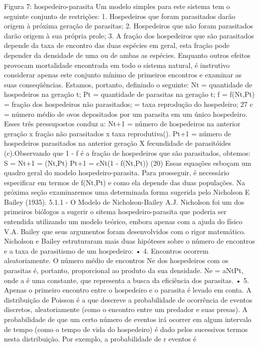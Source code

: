 {{{{{{Figura 7: hospedeiro-parasita 
Um modelo simples para este sistema tem o seguinte conjunto de restrições: 
1. Hospedeiros que foram parasitados darão origem à próxima geração de parasitas; 
2. Hospedeiros que não foram parasitados darão origem à sua própria prole; 
3. A fração dos hospedeiros que são parasitados depende da taxa de encontro das duas espécies em geral, esta fração pode depender da densidade de uma ou de ambas as espécies. 
Enquanto outros efeitos provocam mortalidade encontrada em todo o sistema natural, é instrutivo considerar apenas este conjunto mínimo de primeiros encontros e examinar as suas conseqüências. Estamos, portanto, definindo o seguinte: 
Nt = quantidade de hospedeiros na geração t; 
Pt = quantidade de parasitas na geração t; 
f = f(Nt,Pt) = fração dos hospedeiros não parasitados; 
\lambda = taxa reprodução do hospedeiro; 
27 
c = número médio de ovos depositados por um parasita em um único hospedeiro. Esses três pressupostos conduz a: Nt+1 = número de hospedeiros na anterior geração x fração não parasitados x taxa reprodutiva(\lambda). Pt+1 = número de hospedeiros parasitados na anterior geração X fecundidade de parasitóides (c).Observando que 1 - f é a fração de hospedeiros que são parasitados, obtemos: 
S = 
{ Nt+1 = \lambdaNtf(Nt,Pt) 
Pt+1 = cNt(1 - f(Nt,Pt)) (20) Essas equações esboçam um quadro geral do modelo hospedeiro-parasita. Para prosseguir, é necessário especificar em termos de f(Nt,Pt) e como ela depende das duas populações. Na próxima seção examinaremos uma determinada forma sugerida pelo Nicholson E Bailey (1935). 
5.1.1 - O Modelo de Nicholson-Bailey 
A.J. Nicholson foi um dos primeiros biólogos a sugerir o sitema hospedeiro-parasita que poderia ser entendida utilizando um modelo teórico, embora apenas com a ajuda do físico V.A. Bailey que seus argumentos foram desenvolvidos com o rigor matemático. 
Nicholson e Bailey estruturaram mais duas hipóteses sobre o número de encontros e a taxa de parasitismo de um hospedeiro: 
• 4. Encontros ocorrem aleatoriamente. O número médio de encontros Ne dos hospedeiros com os parasitas é, portanto, proporcional ao produto da sua densidade. 
Ne = aNtPt, 
onde a é uma constante, que representa a busca da eficiência dos parasitas. 
• 5. Apenas o primeiro encontro entre o hospedeiro e o parasita é levado em conta. 
A distribuição de Poisson é a que descreve a probabilidade de ocorrência de eventos discretos, aleatoriamente (como o encontro entre um predador e suas presas). A probabilidade de que um certo número de eventos irá ocorrer em algum intervalo de tempo (como o tempo de vida do hospedeiro) é dado pelos sucessivos termos nesta distribuição. Por exemplo, a probabilidade de r eventos é 
}}}}}}}
